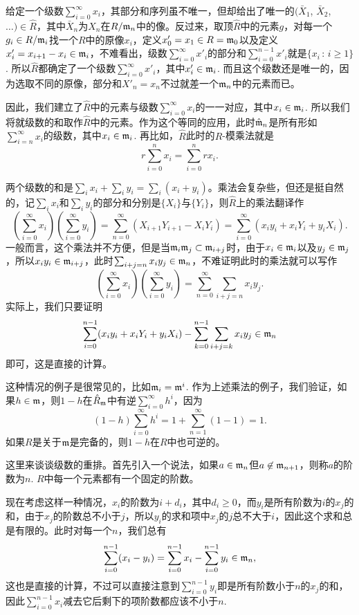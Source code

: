 给定一个级数$\sum_{i=0}^\infty x_i$，其部分和序列虽不唯一，但却给出了唯一的$(\bar{X}_1$, $\bar{X}_2$, $\dots)\in \hat{R}$，其中$\bar{X}_n$为$X_n$在$R/\mathfrak{m}_n$中的像。反过来，取顶$\hat R$中的元素$g$，对每一个$g_i\in R/\mathfrak{m}_i$找一个$R$中的原像$x_i$，定义$x'_0=x_1\in R=\mathfrak{m}_{0}$以及定义$x'_i=x_{i+1}-x_{i}\in \mathfrak{m}_{i}$，不难看出，级数$\sum_{i=0}^\infty x'_i$的部分和$\sum_{i=0}^{n-1} x'_i$就是$\{x_i\,:\,i\geq 1\}$. 所以$\hat R$都确定了一个级数$\sum_{i=0}^\infty x'_i$，其中$x'_i\in \mathfrak{m}_{i}$. 而且这个级数还是唯一的，因为选取不同的原像，部分和$X'_n=x_n$不过就差一个$\mathfrak{m}_n$中的元素而已。

因此，我们建立了$\hat R$中的元素与级数$\sum_{i=0}^\infty x_i$的一一对应，其中$x_i\in\mathfrak{m}_{i}$. 所以我们将就级数的和取作$\hat R$中的元素。作为这个等同的应用，此时$\hat{\mathfrak{m}}_n$是所有形如$\sum_{i=n}^\infty x_i$的级数，其中$x_i\in\mathfrak{m}_i$. 再比如，$\hat R$此时的$R$-模乘法就是
\[
	r\sum_{i=0}^nx_i=\sum_{i=0}^n rx_i.
\]

\para 两个级数的和是$\sum_i x_i+\sum_i y_i =\sum_i(x_i+y_i)$。乘法会复杂些，但还是挺自然的，记$\sum_i x_i$和$\sum_i y_i$的部分和分别是$\{X_i\}$与$\{Y_i\}$，则$\hat R$上的乘法翻译作
\[
	\left(\sum_{i=0}^\infty x_i\right)\left(\sum_{i=0}^\infty y_i\right)=\sum_{n=0}^\infty (X_{i+1}Y_{i+1}-X_{i}Y_i)=\sum_{i=0}^\infty (x_iy_i+x_iY_i+y_iX_i).
\]
一般而言，这个乘法并不方便，但是当$\mathfrak{m}_i\mathfrak{m}_j\subset \mathfrak{m}_{i+j}$时，由于$x_i\in\mathfrak{m}_{i}$以及$y_j\in\mathfrak{m}_{j}$，所以$x_iy_i\in \mathfrak{m}_{i+j}$，此时$\sum_{i+j=n}x_iy_j\in \mathfrak{m}_n$，不难证明此时的乘法就可以写作
\[
	\left(\sum_{i=0}^\infty x_i\right)\left(\sum_{i=0}^\infty y_i\right)=\sum_{n=0}^\infty \sum_{i+j=n}x_iy_j.
\]
实际上，我们只要证明
\[
	\sum_{i=0}^{n-1} (x_iy_i+x_iY_i+y_iX_i)-\sum_{k=0}^{n-1} \sum_{i+j=k}x_iy_j\in \mathfrak{m}_n
\]
即可，这是直接的计算。

这种情况的例子是很常见的，比如$\mathfrak{m}_i=\mathfrak{m}^i$. 作为上述乘法的例子，我们验证，如果$h\in\mathfrak{m}$，则$1-h$在$\hat{R}_{\mathfrak{m}}$中有逆$\sum_{i=0}^\infty h^i$，因为
\[
	(1-h)\sum_{i=0}^\infty h^i=1+\sum_{n=1}^\infty(1-1)=1.
\]
如果$R$是关于$\mathfrak{m}$是完备的，则$1-h$在$R$中也可逆的。

\para 这里来谈谈级数的重排。首先引入一个说法，如果$a\in \mathfrak{m}_{n}$但$a\not\in\mathfrak{m}_{n+1}$，则称$a$的阶数为$n$. $R$中每一个元素都有一个固定的阶数。

现在考虑这样一种情况，$x_i$的阶数为$i+d_i$，其中$d_i\geq 0$，而$y_i$是所有阶数为$i$的$x_j$的和，由于$x_j$的阶数总不小于$j$，所以$y_i$的求和项中$x_j$的$j$总不大于$i$，因此这个求和总是有限的。此时对每一个$n$，我们总有
\[
	\sum_{i=0}^{n-1} (x_i-y_i)=\sum_{i=0}^{n-1} x_i-\sum_{i=0}^{n-1} y_i\in \mathfrak{m}_n,
\]
这也是直接的计算，不过可以直接注意到$\sum_{i=0}^{n-1} y_i$即是所有阶数小于$n$的$x_j$的和，因此$\sum_{i=0}^{n-1} x_i$减去它后剩下的项阶数都应该不小于$n$.

